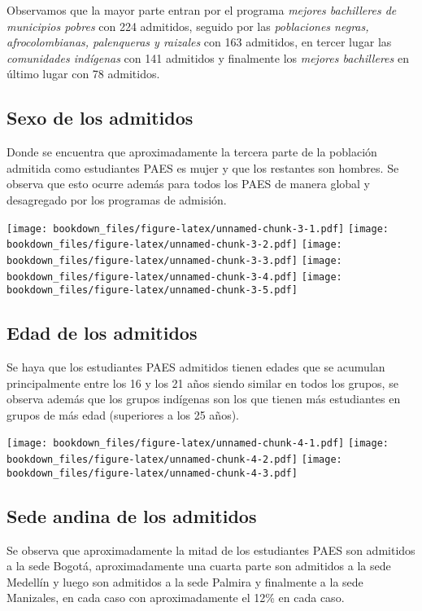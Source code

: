 \documentclass[]{article}
\theoremstyle{definition}
\theoremstyle{definition}
\theoremstyle{definition}
\theoremstyle{remark}
\begin{document}
Observamos que la mayor parte entran por el programa \emph{mejores
bachilleres de municipios pobres} con 224 admitidos, seguido por las
\emph{poblaciones negras, afrocolombianas, palenqueras y raizales} con
163 admitidos, en tercer lugar las \emph{comunidades indígenas} con 141
admitidos y finalmente los \emph{mejores bachilleres} en último lugar
con 78 admitidos.

\subsection{Sexo de los admitidos}\label{sexo-de-los-admitidos}

Donde se encuentra que aproximadamente la tercera parte de la población
admitida como estudiantes PAES es mujer y que los restantes son hombres.
Se observa que esto ocurre además para todos los PAES de manera global y
desagregado por los programas de admisión.

\texttt{[image: bookdown\_files/figure-latex/unnamed-chunk-3-1.pdf]}
\texttt{[image: bookdown\_files/figure-latex/unnamed-chunk-3-2.pdf]}
\texttt{[image: bookdown\_files/figure-latex/unnamed-chunk-3-3.pdf]}
\texttt{[image: bookdown\_files/figure-latex/unnamed-chunk-3-4.pdf]}
\texttt{[image: bookdown\_files/figure-latex/unnamed-chunk-3-5.pdf]}

\subsection{Edad de los admitidos}\label{edad-de-los-admitidos}

Se haya que los estudiantes PAES admitidos tienen edades que se acumulan
principalmente entre los 16 y los 21 años siendo similar en todos los
grupos, se observa además que los grupos indígenas son los que tienen
más estudiantes en grupos de más edad (superiores a los 25 años).

\texttt{[image: bookdown\_files/figure-latex/unnamed-chunk-4-1.pdf]}
\texttt{[image: bookdown\_files/figure-latex/unnamed-chunk-4-2.pdf]}
\texttt{[image: bookdown\_files/figure-latex/unnamed-chunk-4-3.pdf]}

\subsection{Sede andina de los
admitidos}\label{sede-andina-de-los-admitidos}

Se observa que aproximadamente la mitad de los estudiantes PAES son
admitidos a la sede Bogotá, aproximadamente una cuarta parte son
admitidos a la sede Medellín y luego son admitidos a la sede Palmira y
finalmente a la sede Manizales, en cada caso con aproximadamente el 12\%
en cada caso.
\end{document}
